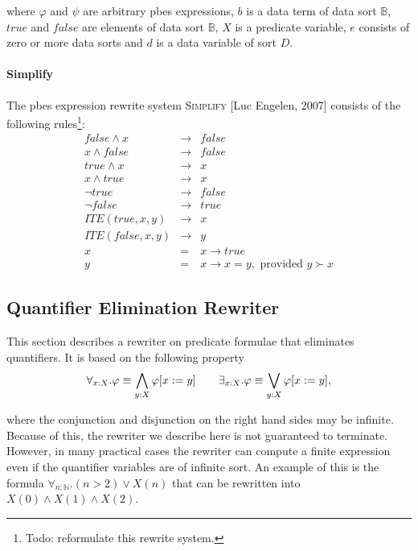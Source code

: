 \documentclass{article}
\begin{document}
where $\varphi $ and $\psi $ are arbitrary pbes expressions, $b$ is a data
term of data sort $\mathbb{B}$, $true$ and $false$ are elements of data sort 
$\mathbb{B}$, $X$ is a predicate variable, $e$ consists of zero or more data
sorts and $d$ is a data variable of sort $D$.

\paragraph{\newpage Simplify}

The pbes expression rewrite system \textsc{Simplify} [Luc Engelen, 2007]
consists of the following rules\footnote{%
Todo: reformulate this rewrite system.}:%
\begin{eqnarray*}
false\wedge x &\rightarrow &false \\
x\wedge false &\rightarrow &false \\
true\wedge x &\rightarrow &x \\
x\wedge true &\rightarrow &x \\
\lnot true &\rightarrow &false \\
\lnot false &\rightarrow &true \\
ITE(true,x,y) &\rightarrow &x \\
ITE(false,x,y) &\rightarrow &y \\
x &=&x\rightarrow true \\
y &=&x\rightarrow x=y,\text{ provided }y\succ x
\end{eqnarray*}

\subsection{Quantifier Elimination Rewriter}

This section describes a rewriter on predicate formulae that eliminates
quantifiers. It is based on the following property%
\begin{equation*}
\begin{array}{cc}
\forall _{x:X}.\varphi \equiv \dbigwedge\limits_{y:X}\varphi \lbrack
x:=y]\quad & \exists _{x:X}.\varphi \equiv \dbigvee\limits_{y:X}\varphi
\lbrack x:=y],%
\end{array}%
\end{equation*}

where the conjunction and disjunction on the right hand sides may be
infinite. Because of this, the rewriter we describe here is not guaranteed
to terminate. However, in many practical cases the rewriter can compute a
finite expression even if the quantifier variables are of infinite sort. An
example of this is the formula $\forall _{n:\mathbb{N}}.(n>2)\vee X(n)$ that
can be rewritten into $X(0)\wedge X(1)\wedge X(2)$.
\end{document}
